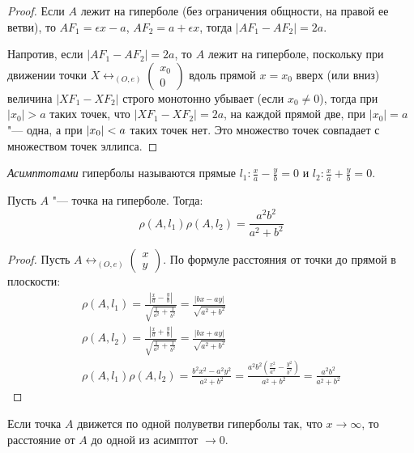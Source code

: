 \begin{proof}
	Если $A$ лежит на гиперболе (без ограничения общности, на правой ее ветви), то $AF_1 = \epsilon x - a$, $AF_2 = a + \epsilon x$, тогда $|AF_1 - AF_2| = 2a$.
	
	Напротив, если $|AF_1 - AF_2| = 2a$, то $A$ лежит на гиперболе, поскольку при движении точки $X \leftrightarrow_{(O, e)} \begin{pmatrix}x_0\\0\end{pmatrix}$ вдоль прямой $x = x_0$ вверх (или вниз) величина $|XF_1 - XF_2|$ строго монотонно убывает (если $x_0 \ne 0$), тогда при $|x_0| > a$ таких точек, что $|XF_1 - XF_2| = 2a$, на каждой прямой две, при $|x_0| = a$ "--- одна, а при $|x_0| \hm{<} a$ таких точек нет. Это множество точек совпадает с множеством точек эллипса.
\end{proof}

\begin{definition}
	\textit{Асимптотами} гиперболы называются прямые $l_1: \frac{x}{a} - \frac{y}{b} = 0$ и $l_2: \frac{x}{a} + \frac{y}{b} = 0$.
\end{definition}

\begin{proposition}
	Пусть $A$ "--- точка на гиперболе. Тогда:
	\[\rho(A, l_1)\rho(A, l_2) = \frac{a^2b^2}{a^2 + b^2}\]
\end{proposition}

\begin{proof}
	Пусть $A \leftrightarrow_{(O, e)} \begin{pmatrix}x\\y\end{pmatrix}$. По формуле расстояния от точки до прямой в плоскости:
	\begin{gather*}
	\rho(A, l_1) = \frac{\left|\frac{x}{a}-\frac{y}{b}\right|}{\sqrt{\frac{1}{a^2} + \frac{1}{b^2}}} = \frac{|bx - ay|}{\sqrt{a^2 + b^2}}\\
	\rho(A, l_2) = \frac{\left|\frac{x}{a}+\frac{y}{b}\right|}{\sqrt{\frac{1}{a^2} + \frac{1}{b^2}}} = \frac{|bx + ay|}{\sqrt{a^2 + b^2}}\\
	\rho(A, l_1)\rho(A, l_2) = \frac{b^2x^2 - a^2y^2}{a^2 + b^2} = \frac{a^2b^2\left(\frac{x^2}{a^2} - \frac{y^2}{b^2}\right)}{a^2 + b^2} = \frac{a^2b^2}{a^2 + b^2}
	\end{gather*}
\end{proof}

\begin{corollary}
	Если точка $A$ движется по одной полуветви гиперболы так, что $x \rightarrow \infty$, то расстояние от $A$ до одной из асимптот $\rightarrow 0$.
\end{corollary}

